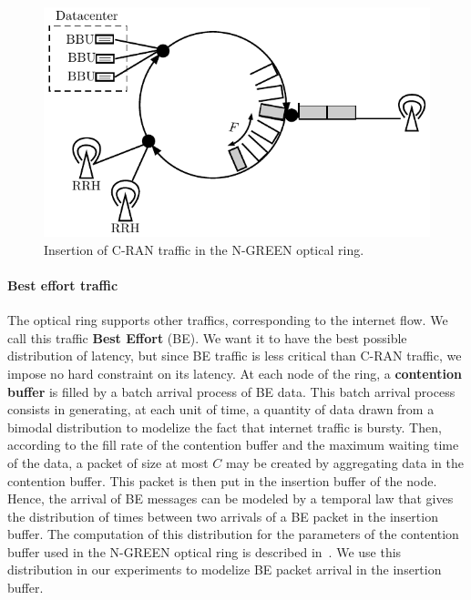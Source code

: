 \documentclass[10pt, conference, letterpaper]{IEEEtran}
\begin{document}
\begin{figure}[h!]
\begin{center}  
      \includegraphics[scale=0.7]{interface.pdf}
     \caption{Insertion of C-RAN traffic in the N-GREEN optical ring.}\label{fig:interface}
\end{center}
  \end{figure}
\vspace{-0.5cm}
\paragraph{Best effort traffic}

The optical ring supports other traffics, corresponding to the internet flow. We call this traffic \textbf{Best Effort} (BE). We want it to have the best possible distribution of latency, but since BE traffic is less critical than C-RAN traffic, we impose no hard constraint on its latency. At each node of the ring, a {\bf contention buffer} is filled by a batch arrival process of BE data. 
This batch arrival process consists in generating, at each unit of time, a quantity of data drawn from a bimodal distribution to modelize the fact that internet traffic is bursty. Then, according to the fill rate of the contention buffer and the maximum waiting time of the data, a packet of size at most $C$ may be created by aggregating data in the contention buffer. This packet is then put in the insertion buffer of the node. Hence, the arrival of BE messages can be modeled by a temporal law that gives the distribution of times between two arrivals of a BE packet in the insertion buffer. The computation of this distribution for the parameters of the contention buffer used in the N-GREEN optical ring is described in~\cite{Cast1810:Performance}. We use this distribution in our experiments to modelize BE packet arrival in the insertion buffer.
\end{document}
